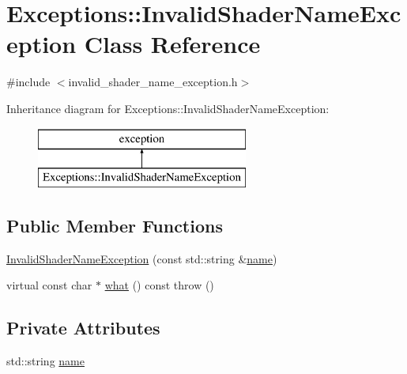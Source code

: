 \hypertarget{class_exceptions_1_1_invalid_shader_name_exception}{}\section{Exceptions\+:\+:Invalid\+Shader\+Name\+Exception Class Reference}
\label{class_exceptions_1_1_invalid_shader_name_exception}


{\ttfamily \#include $<$invalid\+\_\+shader\+\_\+name\+\_\+exception.\+h$>$}

Inheritance diagram for Exceptions\+:\+:Invalid\+Shader\+Name\+Exception\+:\begin{figure}[H]
\begin{center}
\leavevmode
\includegraphics[height=2.000000cm]{class_exceptions_1_1_invalid_shader_name_exception}
\end{center}
\end{figure}
\subsection*{Public Member Functions}
\begin{DoxyCompactItemize}
\item 
\hyperlink{class_exceptions_1_1_invalid_shader_name_exception_a83014c98e72fb045d664a5af323ab023}{Invalid\+Shader\+Name\+Exception} (const std\+::string \&\hyperlink{class_exceptions_1_1_invalid_shader_name_exception_a3d9438219209a9bfe42df58f3107e3c8}{name})
\item 
virtual const char $\ast$ \hyperlink{class_exceptions_1_1_invalid_shader_name_exception_a8a01046b3d3cb4b8459d5f263c2c9295}{what} () const   throw ()
\end{DoxyCompactItemize}
\subsection*{Private Attributes}
\begin{DoxyCompactItemize}
\item 
std\+::string \hyperlink{class_exceptions_1_1_invalid_shader_name_exception_a3d9438219209a9bfe42df58f3107e3c8}{name}
\end{DoxyCompactItemize}


